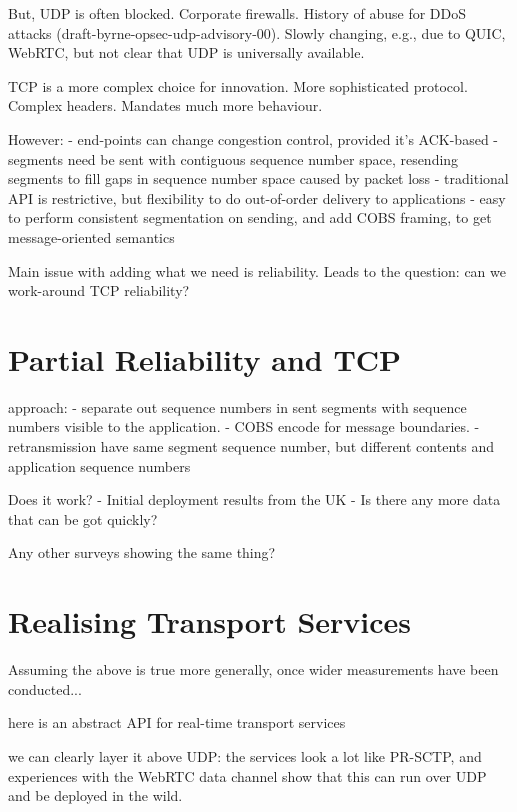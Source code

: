 \documentclass{sig-alternate-05-2015}
\begin{document}
But, UDP is often blocked. Corporate firewalls. History of abuse for DDoS
attacks (draft-byrne-opsec-udp-advisory-00). Slowly changing, e.g., due to
QUIC, WebRTC, but not clear that UDP is universally available.

TCP is a more complex choice for innovation. More sophisticated protocol.
Complex headers. Mandates much more behaviour. 

However:
- end-points can change congestion control, provided it's ACK-based
- segments need be sent with contiguous sequence number space, resending
  segments to fill gaps in sequence number space caused by packet loss
- traditional API is restrictive, but flexibility to do out-of-order 
  delivery to applications
- easy to perform consistent segmentation on sending, and add COBS framing, 
  to get message-oriented semantics

Main issue with adding what we need is reliability. 
Leads to the question: can we work-around TCP reliability?

\section{Partial Reliability and TCP}
\label{sec:partial}

approach: 
- separate out sequence numbers in sent segments with sequence numbers
  visible to the application.
- COBS encode for message boundaries.
- retransmission have same segment sequence number, but different contents
  and application sequence numbers

Does it work?
- Initial deployment results from the UK
- Is there any more data that can be got quickly?

Any other surveys showing the same thing?

\section{Realising Transport Services}
\label{sec:realising}

Assuming the above is true more generally, once wider measurements have
been conducted...

here is an abstract API for real-time transport services

we can clearly layer it above UDP: the services look a lot like PR-SCTP,
and experiences with the WebRTC data channel show that this can run over
UDP and be deployed in the wild.
\end{document}
